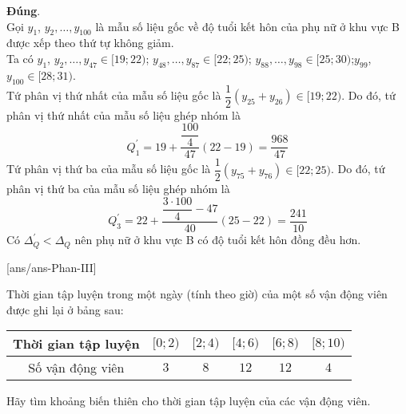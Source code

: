 \begin{ex}
{\begin{itemchoice}
\itemch \textbf{Đúng}.\\
Gọi $y_1$, $y_2,\ldots,y_{100} $ là mẫu số liệu gốc về độ tuổi kết hôn của phụ nữ ở khu vực B được xếp theo thứ tự không giảm.\\
Ta có $y_1$, $y_2,\ldots,y_{47} \in [19;22)$; $ y_{48},\ldots, y_{87} \in[22;25)$; $y_{88}, \ldots, y_{98} \in[25;30)$;$y_{99}$, ${y_{100}}\in[28;31)$.\\
Tứ phân vị thứ nhất của mẫu số liệu gốc là $\dfrac{1}{2}(y_{25}+y_{26})\in[19;22)$.
Do đó, tứ phân vị thứ nhất của mẫu số liệu ghép nhóm là
\[
Q_1^\prime=19+\dfrac{\dfrac{100}{4}}{47}(22-19)=\dfrac{968}{47}
\]
Tứ phân vị thứ ba của mẫu số liệu gốc là $\dfrac{1}{2}(y_{75}+y_{76})\in[22;25)$. Do đó, tứ phân vị thứ ba của mẫu số liệu ghép nhóm là
\[
Q_3^\prime=22+\dfrac{\dfrac{3\cdot 100}{4}-47}{40}(25-22)=\dfrac{241}{10}
\]
Có $\Delta_Q^\prime < \Delta_Q$ nên phụ nữ ở khu vực B có độ tuổi kết hôn đồng đều hơn.
\end{itemchoice}
}
\end{ex}

\caukq
{}[ans/ans\currfilebase-Phan-III]
\begin{ex}%
Thời gian tập luyện trong một ngày (tính theo giờ) của một số vận động viên được ghi lại ở bảng sau:
\begin{center}
\begin{tabular}{|c|c|c|c|c|c|}
\hline
Thời gian tập luyện &$[0; 2)$ &$[2; 4)$ &$[4; 6)$ &$[6; 8)$ &$[8; 10)$\\
\hline
Số vận động viên & $3$ & $8$ & $12$ & $12$ & $4$\\
\hline
\end{tabular}
\end{center}
Hãy tìm khoảng biến thiên cho thời gian tập luyện của các vận động viên.
\end{ex}

